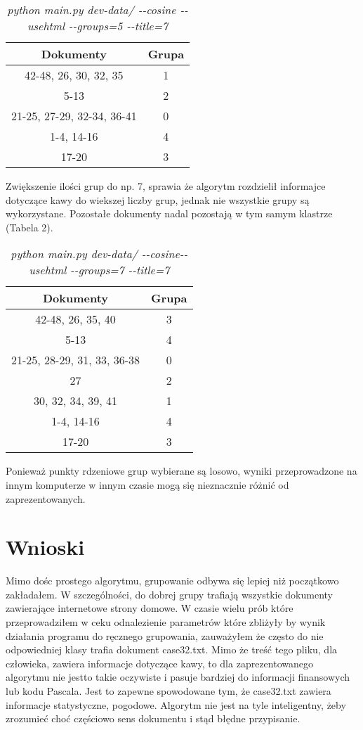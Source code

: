 \documentclass{article}
\begin{document}
\begin{table}[h]
\begin{center}
\begin{tabular}{ | c | c | }
\hline
Dokumenty & Grupa \\ \hline
42-48, 26, 30, 32, 35 & 1 \\ \hline
5-13 & 2 \\ \hline
21-25, 27-29, 32-34, 36-41 & 0 \\ \hline
1-4, 14-16 & 4 \\ \hline
17-20 & 3 \\ \hline
\end{tabular}
\end{center}
\caption{\emph{python main.py dev-data/ -{}-cosine -{}-usehtml -{}-groups=5  -{}-title=7}}
\end{table}

Zwiększenie ilości grup do np. 7, sprawia że algorytm rozdzielił informajce dotyczące kawy do wiekszej liczby grup, jednak nie wszystkie grupy są wykorzystane. Pozostałe dokumenty nadal pozostają w tym samym klastrze (Tabela 2).

\begin{table}[h]
\begin{center}
\begin{tabular}{ | c | c | }
\hline
Dokumenty & Grupa \\ \hline
42-48, 26, 35, 40 & 3 \\ \hline
5-13 & 4 \\ \hline
21-25, 28-29, 31, 33, 36-38 & 0 \\ \hline
27 & 2 \\ \hline
30, 32, 34, 39, 41 & 1 \\ \hline
1-4, 14-16 & 4 \\ \hline
17-20 & 3 \\ \hline
\end{tabular}
\caption{\emph{python main.py dev-data/ -{}-cosine-{}-usehtml -{}-groups=7 -{}-title=7}}
\end{center}
\end{table}

Ponieważ punkty rdzeniowe grup wybierane są losowo, wyniki przeprowadzone na innym komputerze w innym czasie mogą się nieznacznie różnić od zaprezentowanych.

\section{Wnioski}
Mimo dośc prostego algorytmu, grupowanie odbywa się lepiej niż początkowo zakładałem. W szczególności, do dobrej grupy trafiają wszystkie dokumenty zawierające internetowe strony domowe. W czasie wielu prób które przeprowadziłem w ceku odnalezienie parametrów które zbliżyły by wynik działania programu do ręcznego grupowania, zauważyłem że często do nie odpowiedniej klasy trafia dokument case32.txt. Mimo że treść tego pliku, dla człowieka, zawiera informacje dotyczące kawy, to dla zaprezentowanego algorytmu nie jestto takie oczywiste i pasuje bardziej do informacji finansowych lub kodu Pascala. Jest to zapewne spowodowane tym, że case32.txt zawiera informacje statystyczne, pogodowe. Algorytm nie jest na tyle inteligentny, żeby zrozumieć choć częściowo sens dokumentu i stąd błędne przypisanie.
\end{document}
